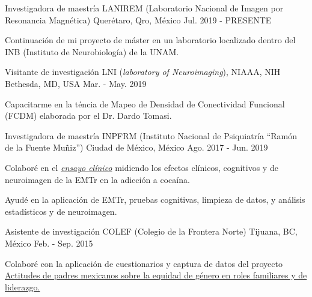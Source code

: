 \vspace{-3.2mm}
\vspace{-1.5mm}
\begin{cventries}
    \cventry
        {Investigadora de maestría}
        {LANIREM (Laboratorio Nacional de Imagen por Resonancia Magnética)}
        {Querétaro, Qro, México}
        {Jul. 2019 - PRESENTE}
        {
            \begin{cvitems}
                \item {Continuación de mi proyecto de máster en un laboratorio localizado dentro del INB (Instituto de Neurobiología) de la UNAM.}
            \end{cvitems}
        }
    \cventry
        {Visitante de investigación}
        {LNI (\textit{laboratory of Neuroimaging}), NIAAA, NIH}
        {Bethesda, MD, USA}
        {Mar. - May. 2019}
        {
            \begin{cvitems}
                \item {Capacitarme en la téncia de Mapeo de Densidad de Conectividad Funcional (FCDM) elaborada por el Dr. Dardo Tomasi.}
            \end{cvitems}
        }
    \cventry
        {Investigadora de maestría}
        {INPFRM (Instituto Nacional de Psiquiatría ``Ramón de la Fuente Muñiz'')}
        {Ciudad de México, México}
        {Ago. 2017 - Jun. 2019}
        {
            \begin{cvitems}
            \item {Colaboré en el \href{https://clinicaltrials.gov/ct2/show/study/NCT02986438?term=Jorge+Gonzalez-Olvera&cntry=MX&rank=2}{\textit{ensayo clínico}} midiendo los efectos clínicos, cognitivos y de neuroimagen de la EMTr en la adicción a cocaína.}
            \item {Ayudé en la aplicación de EMTr, pruebas cognitivas, limpieza de datos, y análisis estadísticos y de neuroimagen.}
            \end{cvitems}
        }
        \cventry
        {Asistente de investigación}
        {COLEF (Colegio de la Frontera Norte)}
        {Tijuana, BC, México}
        {Feb. - Sep. 2015}
        {
            \begin{cvitems}
            \item {Colaboré con la aplicación de cuestionarios y captura de datos del proyecto \href{https://estudiosdemograficosyurbanos.colmex.mx/index.php/edu/article/view/1791/pdf}{Actitudes de padres mexicanos sobre la equidad de género en roles familiares y de liderazgo.}}
            \end{cvitems}
        }
\end{cventries}

